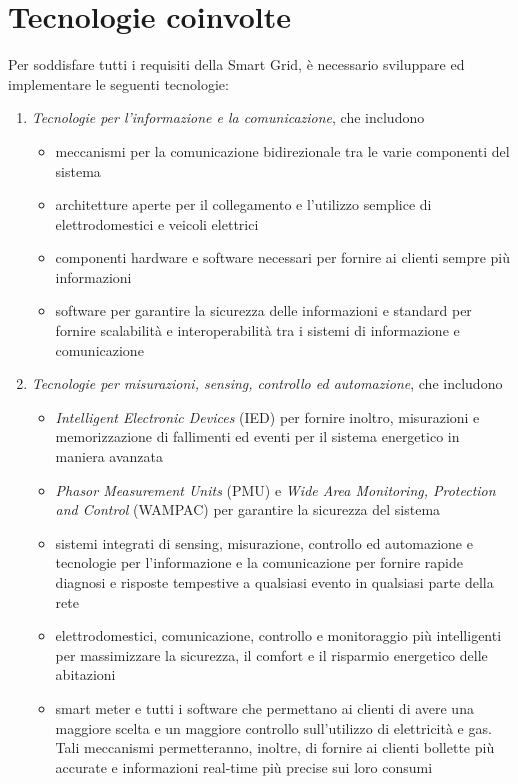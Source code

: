 \section{Tecnologie coinvolte}
Per soddisfare tutti i requisiti della Smart Grid, è necessario sviluppare ed implementare le seguenti tecnologie:
\begin{enumerate}
\item \textit{Tecnologie per l'informazione e la comunicazione}, che includono
	\begin{itemize}
	\item meccanismi per la comunicazione bidirezionale tra le varie componenti del sistema
	\item architetture aperte per il collegamento e l'utilizzo semplice di elettrodomestici e veicoli elettrici
	\item componenti hardware e software necessari per fornire ai clienti sempre più informazioni
	\item software per garantire la sicurezza delle informazioni e standard per fornire scalabilità e interoperabilità tra i sistemi di informazione e comunicazione
	\end{itemize} 
\item \textit{Tecnologie per misurazioni, sensing, controllo ed automazione}, che includono
	\begin{itemize}
	\item \textit{Intelligent Electronic Devices} (IED) per fornire inoltro, misurazioni e memorizzazione di fallimenti ed eventi per il sistema energetico in maniera avanzata
	\item \textit{Phasor Measurement Units} (PMU) e \textit{Wide Area Monitoring, Protection and Control} (WAMPAC) per garantire la sicurezza del sistema
	\item sistemi integrati di sensing, misurazione, controllo ed automazione e tecnologie per l'informazione e la comunicazione per fornire rapide diagnosi e risposte tempestive a qualsiasi evento in qualsiasi parte della rete
	\item elettrodomestici, comunicazione, controllo e monitoraggio più intelligenti per massimizzare la sicurezza, il comfort e il risparmio energetico delle abitazioni
	\item smart meter e tutti i software che permettano ai clienti di avere una maggiore scelta e un maggiore controllo sull'utilizzo di elettricità e gas. \newline Tali meccanismi permetteranno, inoltre, di fornire ai clienti bollette più accurate e informazioni real-time più precise sui loro consumi

\end{itemize}
\end{enumerate}
